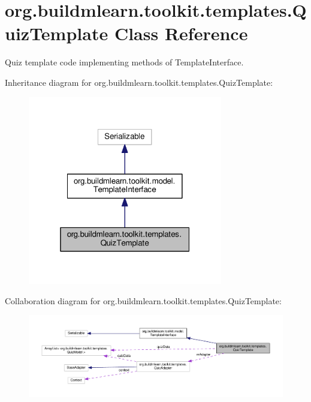 \hypertarget{classorg_1_1buildmlearn_1_1toolkit_1_1templates_1_1QuizTemplate}{}\section{org.\+buildmlearn.\+toolkit.\+templates.\+Quiz\+Template Class Reference}
\label{classorg_1_1buildmlearn_1_1toolkit_1_1templates_1_1QuizTemplate}


Quiz template code implementing methods of Template\+Interface.  




Inheritance diagram for org.\+buildmlearn.\+toolkit.\+templates.\+Quiz\+Template\+:
\nopagebreak
\begin{figure}[H]
\begin{center}
\leavevmode
\includegraphics[width=241pt]{classorg_1_1buildmlearn_1_1toolkit_1_1templates_1_1QuizTemplate__inherit__graph}
\end{center}
\end{figure}


Collaboration diagram for org.\+buildmlearn.\+toolkit.\+templates.\+Quiz\+Template\+:
\nopagebreak
\begin{figure}[H]
\begin{center}
\leavevmode
\includegraphics[width=350pt]{classorg_1_1buildmlearn_1_1toolkit_1_1templates_1_1QuizTemplate__coll__graph}
\end{center}
\end{figure}
